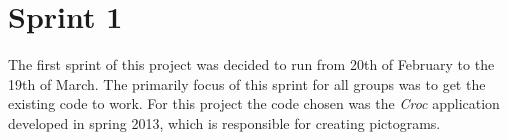 \chapter{Sprint 1}
The first sprint of this project was decided to run from 20th of February to the 19th of March.
The primarily focus of this sprint for all groups was to get the existing code to work.
For this project the code chosen was the \textit{Croc} application developed in spring 2013, which is responsible for creating pictograms.




